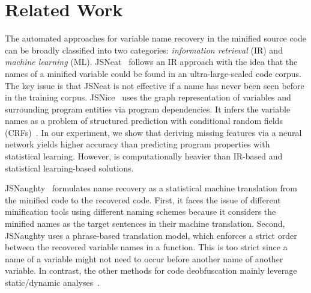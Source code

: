 \section{Related Work}
\label{related_section}

The automated approaches for variable name recovery in the minified
source code can be broadly classified into two categories: {\em
  information retrieval} (IR) and {\em machine learning} (ML).
JSNeat~\cite{icse19} follows an IR approach with the idea that the
names of a minified variable could be found in an ultra-large-scaled
code corpus. The key issue is that JSNeat is not effective if a name
has never been seen before in the training
corpus. JSNice~\cite{JSNice2015} uses the graph representation of
variables and surrounding program entities via program
dependencies. It infers the variable names as a problem of structured
prediction with conditional random fields (CRFs)~\cite{JSNice2015}.
In our experiment, we show that deriving missing features via a neural
network yields higher accuracy than predicting program properties with
statistical learning. However, {\tool} is computationally heavier than
IR-based and statistical learning-based solutions.

JSNaughty~\cite{JSNaughty2017} formulates name recovery as a
statistical machine translation from the minified code to the
recovered code. First, it faces the issue of different minification
tools using different naming schemes because it considers the minified
names as the target sentences in their machine translation.  Second,
JSNaughty uses a phrase-based translation model, which enforces a
strict order between the recovered variable names in a function. This
is too strict since a name of a variable might not need to occur
before another name of another variable.  In contrast, the other
methods for code deobfuscation mainly leverage static/dynamic
analyses~\cite{Christodorescu:2003:SAE:1251353.1251365,Moser:2007:EME:1263552.1264210,Udupa05deobfuscation:reverse}.



